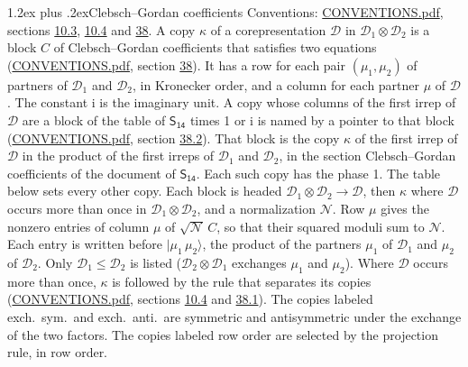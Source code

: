 \documentclass[10pt,a4paper]{article}
\makeatletter
\renewcommand\section{\@startsection{section}{1}{\z@}{-3ex plus -1ex minus -.2ex}%
  {1.2ex plus .2ex}{\normalfont\large\sffamily\bfseries\color{parttitle}}}
\numberwithin{equation}{section}
\newcommand{\grp}[1]{\mathsf{#1}}
\newcommand{\iunit}{\mathrm{i}}
\newcommand{\irrprod}{\otimes}
\newcommand{\mult}{\kappa}
\newcommand{\intx}{\mu}
\newcommand{\cgnorm}{\mathcal{N}}
\newcommand{\prodket}[2]{\lvert {#1}\,{#2}\rangle}
\makeatother
\begin{document}
\section{Clebsch--Gordan coefficients}\label{s:clebsch_gordan}
Conventions: \href{../../CONVENTIONS.pdf}{CONVENTIONS.pdf}, sections \href{../../../rotation/CONVENTIONS.pdf\#conv.10.3}{10.3}, \href{../../../rotation/CONVENTIONS.pdf\#conv.10.4}{10.4} and \href{../../CONVENTIONS.pdf\#conv.38}{38}.
\leavevmode\label{n:index.copy}\label{n:matrix.cg.stored}A copy $\mult$ of a corepresentation $\mathcal{D}$ in $\mathcal{D}_1\irrprod\mathcal{D}_2$ is a block $C$ of Clebsch--Gordan coefficients that satisfies two equations (\href{../../CONVENTIONS.pdf}{CONVENTIONS.pdf}, section \href{../../CONVENTIONS.pdf\#conv.38}{38}). \label{n:index.cg}It has a row for each pair $(\intx_1, \intx_2)$ of partners of $\mathcal{D}_1$ and $\mathcal{D}_2$, in Kronecker order, and a column for each partner $\intx$ of $\mathcal{D}$.
The constant $\iunit$ is the imaginary unit.
A copy whose columns of the first irrep of $\mathcal{D}$ are a block of the table of $\grp{S_{14}}$ times 1 or $\iunit$ is named by a pointer to that block (\href{../../CONVENTIONS.pdf}{CONVENTIONS.pdf}, section \href{../../CONVENTIONS.pdf\#conv.38.2}{38.2}). That block is the copy $\mult$ of the first irrep of $\mathcal{D}$ in the product of the first irreps of $\mathcal{D}_1$ and $\mathcal{D}_2$, in the section Clebsch--Gordan coefficients of the document of \href{../../../rotation/data/pdf/S14.pdf}{$\grp{S_{14}}$}. Each such copy has the phase 1. The table below sets every other copy.
Each block is headed $\mathcal{D}_1\irrprod\mathcal{D}_2\to\mathcal{D}$, then $\mult$ where $\mathcal{D}$ occurs more than once in $\mathcal{D}_1\irrprod\mathcal{D}_2$, and a normalization $\cgnorm$. Row $\intx$ gives the nonzero entries of column $\intx$ of $\sqrt{\cgnorm}\,C$, so that their squared moduli sum to $\cgnorm$. \label{n:vector.ket.product}Each entry is written before $\prodket{\intx_1}{\intx_2}$, the product of the partners $\intx_1$ of $\mathcal{D}_1$ and $\intx_2$ of $\mathcal{D}_2$. Only $\mathcal{D}_1 \le \mathcal{D}_2$ is listed ($\mathcal{D}_2\irrprod\mathcal{D}_1$ exchanges $\intx_1$ and $\intx_2$).
Where $\mathcal{D}$ occurs more than once, $\mult$ is followed by the rule that separates its copies (\href{../../CONVENTIONS.pdf}{CONVENTIONS.pdf}, sections \href{../../../rotation/CONVENTIONS.pdf\#conv.10.4}{10.4} and \href{../../CONVENTIONS.pdf\#conv.38.1}{38.1}). \label{n:abbreviation.exchange}The copies labeled exch.\ sym.\ and exch.\ anti.\ are symmetric and antisymmetric under the exchange of the two factors. The copies labeled row order are selected by the projection rule, in row order.
\end{document}
